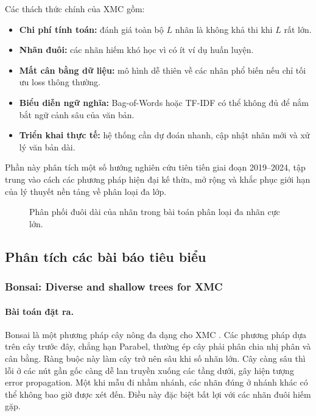 Các thách thức chính của XMC gồm:
\begin{itemize}[leftmargin=2em]
  \item \textbf{Chi phí tính toán:} đánh giá toàn bộ $L$ nhãn là không khả thi khi $L$ rất lớn.
  \item \textbf{Nhãn đuôi:} các nhãn hiếm khó học vì có ít ví dụ huấn luyện.
  \item \textbf{Mất cân bằng dữ liệu:} mô hình dễ thiên về các nhãn phổ biến nếu chỉ tối ưu loss thông thường.
  \item \textbf{Biểu diễn ngữ nghĩa:} Bag-of-Words hoặc TF-IDF có thể không đủ để nắm bắt ngữ cảnh sâu của văn bản.
  \item \textbf{Triển khai thực tế:} hệ thống cần dự đoán nhanh, cập nhật nhãn mới và xử lý văn bản dài.
\end{itemize}

Phần này phân tích một số hướng nghiên cứu tiên tiến giai đoạn 2019--2024, tập trung vào cách các phương pháp hiện đại kế thừa, mở rộng và khắc phục giới hạn của lý thuyết nền tảng về phân loại đa lớp.
\begin{figure}[H]
\centering
\resizebox{0.98\textwidth}{!}{}
\caption{Phân phối đuôi dài của nhãn trong bài toán phân loại đa nhãn cực lớn.}
\label{fig:xmc-long-tail}
\end{figure}


\subsection{Phân tích các bài báo tiêu biểu}

\subsubsection{Bonsai: Diverse and shallow trees for XMC}

\paragraph{Bài toán đặt ra.} Bonsai là một phương pháp cây nông đa dạng cho XMC \cite{khandagale2020bonsai}.
Các phương pháp dựa trên cây trước đây, chẳng hạn Parabel, thường ép cây phải phân chia nhị phân và cân bằng. Ràng buộc này làm cây trở nên sâu khi số nhãn lớn. Cây càng sâu thì lỗi ở các nút gần gốc càng dễ lan truyền xuống các tầng dưới, gây hiện tượng error propagation. Một khi mẫu đi nhầm nhánh, các nhãn đúng ở nhánh khác có thể không bao giờ được xét đến. Điều này đặc biệt bất lợi với các nhãn đuôi hiếm gặp.

